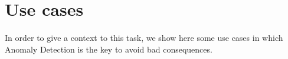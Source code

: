 \begin{comment}
    \paragraph{}
    Consequently, the formation of patterns is a necessary first step in the detection process, followed by the identification of the units that violate those patterns.
    Each method specifies a distance function, such as the Euclidean distance for numerical data, that can be used to calculate how far away and so unique an instance is from other instances. \newline
    As a result, according to the description given above, one may define an "anomalous" point as one that deviates from the norm, or the expected normal behavior or value usual for a given dataset. The data unit could be out of proportion to the majority of the data, which would cause it to deviate from the average values. When the dataset is visualized, an anomalous data unit will stand out significantly from the other data units, which are all closely spaced. \newline
    
    \paragraph{}
    However, in reality, anomaly identification is still difficult because most anomalies have unclear definitions. The term "global anomaly" typically refers to a unit that is significantly different from the dataset from any perspective. Both automatically and manually, it is simple to recognize. Local anomalies, however, or little clusters of aberrant data that are relatively close to the main dataset or values that differ from it insignificantly, are the problem. These ambiguities suggest that rather than using one of the two labels—normal or anomalous—a more sensitive method of finding anomalies is through their scoring in terms of anomaly intensity.
\end{comment}

\section{Use cases}
\paragraph{}
In order to give a context to this task, we show here some use cases in which Anomaly Detection is the key to avoid bad consequences.

